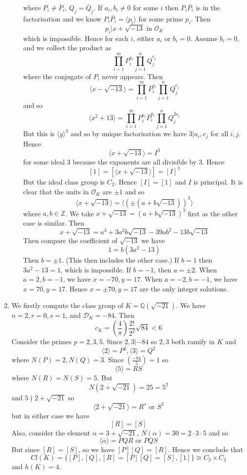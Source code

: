 \begin{enumerate}
\begin{enumerate}
where $P_i \neq \bar{P}_i$, $Q_j=\bar{Q}_j$.
If $a_i,b_i \neq 0$ for some $i$ then $P_i\bar{P_i}$ is in the factorisation and we know
$P_i\bar{P_i}=\langle p_i \rangle$ for some prime $p_i$. Then
$$p_i |x+\sqrt{-13} \text{ in } \mathcal{O}_K$$
which is impossible. Hence for each $i$, either $a_i$ or $b_i=0$. Assume $b_i=0$, and we collect
the product as
$$\prod_{i=1}^m P^{a_i}_i \prod_{j=1}^n Q^{c_j}_j$$
where the conjugate of $P_i$ never appears.
Then
$$\langle x-\sqrt{-13} \rangle=\prod_{i=1}^m \bar{P}^{a_i}_i \prod_{j=1}^n Q^{c_j}_j$$
and so
$$\langle x^2+13\rangle=\prod_{i=1}^m P^{a_i}_i \bar{P}^{a_i}_i \prod_{j=1}^n Q^{2c_j}_j$$
But this is $\langle y \rangle^3$ and so by unique factorisation we have
$3|a_i,c_j$ for all $i,j$. Hence
$$\langle x+\sqrt{-13} \rangle=I^3$$
for some ideal $3$ because the exponents are all divisible by $3$.
Hence
$$[1]=[\langle x+\sqrt{-13} \rangle]=[I]^3$$
But the ideal class group is $C_2$. Hence $[I]=[1]$ and $I$ is principal.
It is clear that the units in $\mathcal{O}_K$ are $\pm 1$ and so
$$\langle x+\sqrt{-13} \rangle=\langle \left(\pm (a+b\sqrt{-13})\right)^3 \rangle$$
where $a,b \in \mathbb{Z}$.
We take $x+\sqrt{-13}=(a+b\sqrt{-13})^3$ first as the other case is similar.
Then
$$x+\sqrt{-13}=a^3+3a^2b\sqrt{-13}-39ab^2-13b\sqrt{-13}$$
Then compare the coefficient of $\sqrt{-13}$ we have
$$1=b(3a^2-13)$$
Then $b=\pm 1$. (This then includes the other case.)
If $b=1$ then $3a^2-13=1$, which is impossible. If $b=-1$, then $a=\pm 2$.
When $a=2,b=-1$, we have $x=-70,y=17$. When $a=-2,b=-1$, we have $x=70,y=17$.
Hence $x=\pm 70, y=17$ are the only integer solutions.
\end{enumerate}
\item We firstly compute the class group of $K=\mathbb{Q}(\sqrt{-21})$.
We have $n=2,r=0,s=1$, and $\mathcal{D}_K=-84$. Then
$$c_K=\left(\frac{4}{\pi}\right)\frac{2!}{2^2}\sqrt{84}<6$$
Consider the primes $p=2,3,5$.
Since $2,3|-84$ so $2,3$ both ramify in $K$ and
$$\langle 2 \rangle=P^2,\langle 3 \rangle=Q^2$$
where $N(P)=2,N(Q)=3$. Since $(\frac{-84}{5})=1$ so
$$\langle 5 \rangle=RS$$
where $N(R)=N(S)=5$. But
$$N(2 + \sqrt{-21})=25=5^2$$
and $5 \nmid 2+\sqrt{-21}$ so
$$\langle 2+\sqrt{-21} \rangle=R^s \text{ or }S^2$$
but in either case we have
$$[R]=[S]$$
Also, consider the element $\alpha=3+\sqrt{-21}$, $N(\alpha)=30=2\cdot 3 \cdot 5$ and so
$$\langle \alpha \rangle=PQR \text{ or } PQS$$
But since $[R]=[S]$, so we have $[P][Q]=[R]$.
Hence we conclude that
$$Cl(K)=\{[P],[Q],[R]=[P][Q]=[S],[1]\} \cong C_2 \times C_2$$
and $h(K)=4$.


\end{enumerate}
